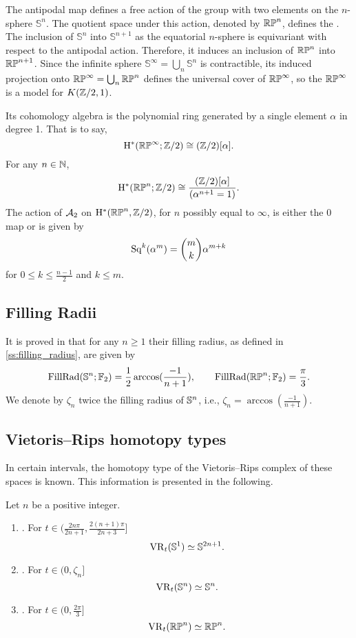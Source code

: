 The antipodal map defines a free action of the group with two elements on the $n$-sphere \(\mathbb{S}^n\).
The quotient space under this action, denoted by \(\mathbb{RP}^n\), defines the .
The inclusion of \(\mathbb{S}^n\) into \(\mathbb{S}^{n+1}\) as the equatorial $n$-sphere is equivariant with respect to the antipodal action.
Therefore, it induces an inclusion of \(\mathbb{RP}^n\) into \(\mathbb{RP}^{n+1}\).
Since the infinite sphere \(\mathbb{S}^\infty = \bigcup_n \mathbb{S}^n\) is contractible, its induced projection onto $\mathbb{RP}^\infty = \bigcup_n \mathbb{RP}^n$ defines the universal cover of \(\mathbb{RP}^\infty\), so the  $\mathbb{RP}^\infty$ is a model for \(K(\mathbb{Z}/2, 1)\).

Its cohomology algebra is the polynomial ring generated by a single element $\alpha$ in degree 1.
That is to say,
\[
\mathrm{H}^\ast(\mathbb{RP}^\infty; \mathbb{Z}/2) \cong (\mathbb{Z}/2)[\alpha].
\]
For any $n \in \mathbb{N}$,
\[
\mathrm{H}^\ast(\mathbb{RP}^n; \mathbb{Z}/2) \cong \frac{(\mathbb{Z}/2)[\alpha]}{(\alpha^{n+1} = 1)}.
\]
The action of $\mathcal{A}_2$ on $\mathrm{H}^*(\mathbb{RP}^n, \mathbb{Z}/2)$, for $n$ possibly equal to $\infty$, is either the 0 map or is given by
\[
\operatorname{Sq}^k(\alpha^m) = \binom{m}{k}\alpha^{m+k}
\]
for $0 \leq k \leq \frac{n-1}{2}$ and $k \leq m$.

\subsection{Filling Radii}

It is proved in \cite{katz1983filling} that for any $n \geq 1$ their filling radius, as defined in \cref{ss:filling_radius}, are given by
\[
\operatorname{FillRad}(\mathbb{S}^n;{\mathbb{F}_2}) = \frac{1}{2}\arccos(\frac{-1}{n+1}), \qquad
\operatorname{FillRad}(\mathbb{RP}^n;{\mathbb{F}_2}) = \frac{\pi}{3}.
\]
We denote by $\zeta_n$ twice the filling radius of $\mathbb{S}^n$, i.e., $\zeta_n = \arccos(\frac{-1}{n+1})$.

\subsection{Vietoris--Rips homotopy types}\label{prop:homotopy type}

In certain intervals, the homotopy type of the Vietoris--Rips complex of these spaces is known.
This information is presented in the following.

\medskip\proposition Let $n$ be a positive integer.
\begin{enumerate}[{\rm (a)}]
	\item\label{prop:S1}{\rm \cite[Thm.~7.4]{adamaszek2017vietoris}.}
	For $t \in (\frac{2n\pi}{2n+1}, \frac{2(n+1)\pi}{2n+3}]$
	\[
	\operatorname{VR}_t(\mathbb{S}^1) \simeq \mathbb{S}^{2n+1}.
	\]
	
	\item\label{prop:Sn}{\rm \cite[Thm.~7.1]{lim2020vietoris}.}
	For $t \in (0, \zeta_n]$
	\[
	\operatorname{VR}_t(\mathbb{S}^n) \simeq \mathbb{S}^n.
	\]
	
	\item\label{prop:RPn}{\rm \cite[Thm.~4.5]{adams2022metric}.}
	For $t \in (0,\frac{2\pi}{3} ]$
	\[
	\operatorname{VR}_t(\mathbb{RP}^n) \simeq \mathbb{RP}^n.
	\]
\end{enumerate}
